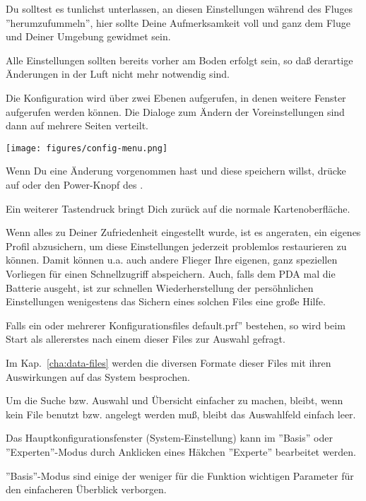 Du solltest es tunlichst unterlassen, an diesen Einstellungen während des Fluges
''herumzufummeln'', hier sollte Deine Aufmerksamkeit voll und ganz dem Fluge und
Deiner Umgebung gewidmet sein. \warning

Alle Einstellungen sollten bereits vorher am Boden erfolgt sein, so daß derartige
Änderungen in der Luft nicht mehr notwendig sind.

Die Konfiguration wird über zwei Ebenen aufgerufen, in denen weitere Fenster aufgerufen werden können.
Die Dialoge zum Ändern  der Voreinstellungen sind dann auf mehrere Seiten verteilt.

\begin{center}
\texttt{[image: figures/config-menu.png]}
\end{center}

Wenn Du eine Änderung vorgenommen hast und diese speichern willst, drücke auf  oder
den Power-Knopf des \al .

Ein weiterer Tastendruck bringt Dich zurück auf die normale Kartenoberfläche.

\tip Wenn alles zu Deiner Zufriedenheit eingestellt wurde, ist es angeraten, ein eigenes Profil
abzusichern, um diese Einstellungen jederzeit problemlos restaurieren zu können. Damit können u.a. auch
andere Flieger Ihre eigenen, ganz speziellen Vorliegen für einen Schnellzugriff abspeichern.
Auch, falls dem PDA mal  die Batterie ausgeht, ist zur schnellen Wiederherstellung der persöhnlichen
Einstellungen wenigestens das Sichern eines solchen Files eine große Hilfe.

Falls ein oder mehrerer Konfigurationsfiles \verb''default.prf''  bestehen, so wird beim Start als allererstes nach
einem dieser Files zur Auswahl gefragt.

Im Kap.~\ref{cha:data-files} werden die diversen Formate dieser Files mit ihren
Auswirkungen auf das System besprochen.

Um die Suche bzw. Auswahl und Übersicht einfacher zu machen, bleibt,
wenn kein File benutzt bzw. angelegt werden muß, bleibt das Auswahlfeld einfach leer.

Das Hauptkonfigurationsfenster (System-Einstellung) kann im ''Basis'' oder
''Experten''-Modus durch Anklicken eines Häkchen ''Experte'' bearbeitet werden.

''Basis''-Modus sind einige der weniger für die Funktion wichtigen Parameter für den
einfacheren Überblick verborgen. 

